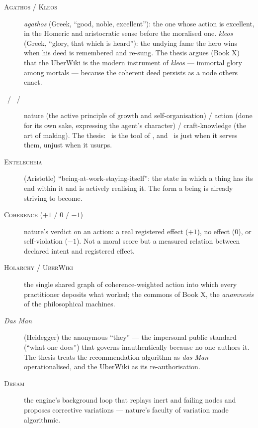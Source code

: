 \begin{description}
\item[\textsc{Agathos} / \textsc{Kleos}] \emph{agathos} (Greek, ``good, noble,
excellent''): the one whose action is excellent, in the Homeric and aristocratic
sense before the moralised one. \emph{kleos} (Greek, ``glory, that which is
heard''): the undying fame the hero wins when his deed is remembered and re-sung.
The thesis argues (Book X) that the UberWiki is the modern instrument of
\emph{kleos} --- immortal glory among mortals --- because the coherent deed
persists as a node others enact.

\item[\physis\ / \praxis\ / \techne] nature (the active principle of growth and
self-organisation) / action (done for its own sake, expressing the agent's
character) / craft-knowledge (the art of making). The thesis: \praxis\ is the
tool of \physis, and \techne\ is just when it serves them, unjust when it usurps.

\item[\textsc{Entelecheia}] (Aristotle) ``being-at-work-staying-itself'': the
state in which a thing has its end within it and is actively realising it. The
form a being is already striving to become.

\item[\textsc{Coherence} ($+1$ / $0$ / $-1$)] nature's verdict on an action:
a real registered effect ($+1$), no effect ($0$), or self-violation ($-1$). Not a
moral score but a measured relation between declared intent and registered effect.

\item[\textsc{Holarchy} / \textsc{UberWiki}] the single shared graph of
coherence-weighted action into which every practitioner deposits what worked; the
commons of Book X, the \emph{anamnesis} of the philosophical machines.

\item[\emph{Das Man}] (Heidegger) the anonymous ``they'' --- the impersonal public
standard (``what one does'') that governs inauthentically because no one authors
it. The thesis treats the recommendation algorithm as \emph{das Man}
operationalised, and the UberWiki as its re-authorisation.

\item[\textsc{Dream}] the engine's background loop that replays inert and failing
nodes and proposes corrective variations --- nature's faculty of variation made
algorithmic.

\end{description}
